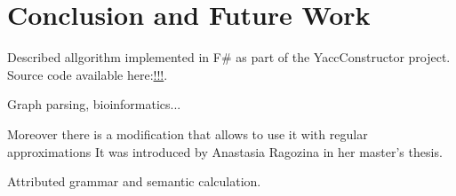 \documentclass[runningheads,a4paper]{llncs}
\begin{document}
\section{Conclusion and Future Work}

Described allgorithm implemented in F\# as part of the YaccConstructor project.
Source code available here:\url{!!!}.

Graph parsing, bioinformatics...

Moreover there is a modification that allows to use it with regular approximations It was introduced by 
Anastasia Ragozina in her master's thesis.


Attributed grammar and semantic calculation.





\end{document}
